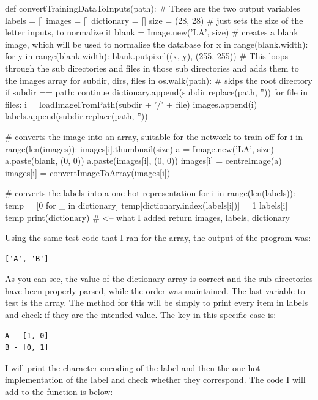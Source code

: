 \documentclass{report}
\begin{document}
\begin{python}
def convertTrainingDataToInputs(path):
    # These are the two output variables
    labels = []
    images = []
    dictionary = []
    size = (28, 28)  # just sets the size of the letter inputs, to normalize it
    blank = Image.new('LA', size)  # creates a blank image, which will be used to normalise the database
    for x in range(blank.width):
        for y in range(blank.width):
            blank.putpixel((x, y), (255, 255))
    # This loops through the sub directories and files in those sub directories and adds them to the images array
    for subdir, dirs, files in os.walk(path):
        # skips the root directory
        if subdir == path:
            continue
        dictionary.append(subdir.replace(path, ''))
        for file in files:
            i = loadImageFromPath(subdir + '/' + file)
            images.append(i)
            labels.append(subdir.replace(path, ''))
            
    # converts the image into an array, suitable for the network to train off
    for i in range(len(images)):
        images[i].thumbnail(size)
        a = Image.new('LA', size)
        a.paste(blank, (0, 0))
        a.paste(images[i], (0, 0))
        images[i] = centreImage(a)
        images[i] = convertImageToArray(images[i])

    # converts the labels into a one-hot representation
    for i in range(len(labels)):
        temp = [0 for _ in dictionary]
        temp[dictionary.index(labels[i])] = 1
        labels[i] = temp
    print(dictionary)  # <-- what I added
    return images, labels, dictionary
\end{python}
Using the same test code that I ran for the  array, the output of the program was:
\begin{verbatim}
['A', 'B']
\end{verbatim}
As you can see, the value of the dictionary array is correct and the sub-directories have been properly parsed, while the order was maintained.
\newline
The last variable to test is the  array. The method for this will be simply to print every item in labels and check if they are the intended value. The key in this specific case is:
\begin{verbatim}
A - [1, 0]
B - [0, 1]
\end{verbatim}
I will print the character encoding of the label and then the one-hot implementation of the label and check whether they correspond. The code I will add to the function is below:
\end{document}
